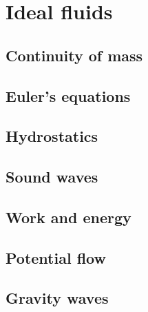 \part{Ideal fluids}

\chapter{Continuity of mass}


\chapter{Euler's equations}








\chapter{Hydrostatics}



\chapter{Sound waves}




\chapter{Work and energy}
\label{ss:Euler_energy}



\chapter{Potential flow}


\chapter{Gravity waves}





